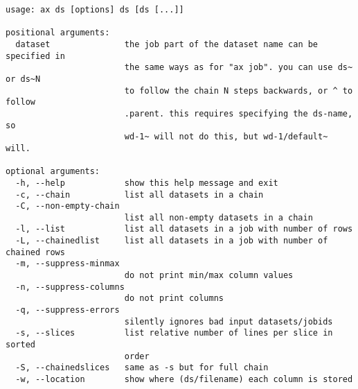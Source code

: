 \begin{snugshade}
\begin{verbatim}
usage: ax ds [options] ds [ds [...]]

positional arguments:
  dataset               the job part of the dataset name can be specified in
                        the same ways as for "ax job". you can use ds~ or ds~N
                        to follow the chain N steps backwards, or ^ to follow
                        .parent. this requires specifying the ds-name, so
                        wd-1~ will not do this, but wd-1/default~ will.

optional arguments:
  -h, --help            show this help message and exit
  -c, --chain           list all datasets in a chain
  -C, --non-empty-chain
                        list all non-empty datasets in a chain
  -l, --list            list all datasets in a job with number of rows
  -L, --chainedlist     list all datasets in a job with number of chained rows
  -m, --suppress-minmax
                        do not print min/max column values
  -n, --suppress-columns
                        do not print columns
  -q, --suppress-errors
                        silently ignores bad input datasets/jobids
  -s, --slices          list relative number of lines per slice in sorted
                        order
  -S, --chainedslices   same as -s but for full chain
  -w, --location        show where (ds/filename) each column is stored
\end{verbatim}
\end{snugshade}

